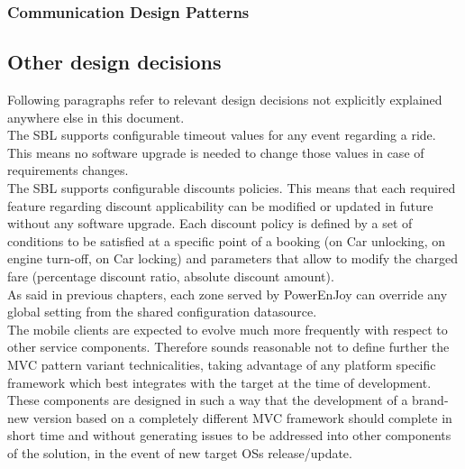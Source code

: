 \subsubsection{Communication Design Patterns}


\subsection{Other design decisions}
Following paragraphs refer to relevant design decisions not explicitly explained anywhere else in this document.\\

The SBL supports configurable timeout values for any event regarding a ride. This means no software upgrade is needed to change those values in case of requirements changes.\\

The SBL supports configurable discounts policies. This means that each required feature regarding discount applicability can be modified or updated in future without any software upgrade. Each discount policy is defined by a set of conditions to be satisfied at a specific point of a booking (on Car unlocking, on engine turn-off, on Car locking) and parameters that allow to modify the charged fare (percentage discount ratio, absolute discount amount).\\

As said in previous chapters, each zone served by PowerEnJoy can override any global setting from the shared configuration datasource.\\

The mobile clients are expected to evolve much more frequently with respect to other service components. Therefore sounds reasonable not to define further the MVC pattern variant technicalities, taking advantage of any platform specific framework which best integrates with the target at the time of development. These components are designed in such a way that the development of a brand-new version based on a completely different MVC framework should complete in short time and without generating issues to be addressed into other components of the solution, in the event of new target OSs release/update.\\ 

